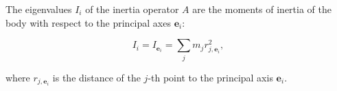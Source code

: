 The eigenvalues $I_i$ of the inertia operator $A$ are the moments of inertia of the body with respect to the principal axes $\mathbf{e}_i$:

$$I_i = I_{\mathbf{e}_i} = \sum_j m_j r_{j,\mathbf{e}_i}^2,$$

where $r_{j,\mathbf{e}_i}$ is the distance of the $j$-th point to the principal axis $\mathbf{e}_i$.
